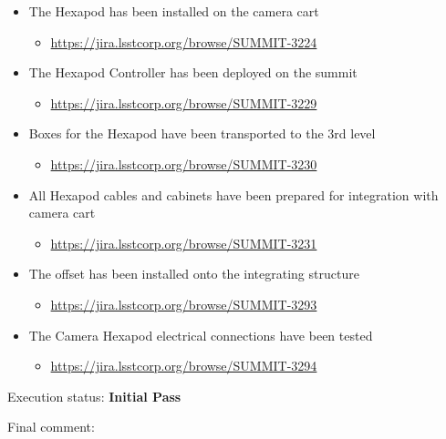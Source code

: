 \documentclass[SE,lsstdraft,STR,toc]{lsstdoc}
\providecommand{\tightlist}{
  \setlength{\itemsep}{0pt}\setlength{\parskip}{0pt}}
\begin{document}
\begin{itemize}
\tightlist
\item
  The Hexapod has been installed on the camera cart

  \begin{itemize}
  \tightlist
  \item
    \url{https://jira.lsstcorp.org/browse/SUMMIT-3224}
  \end{itemize}
\item
  The Hexapod Controller has been deployed on the summit

  \begin{itemize}
  \tightlist
  \item
    \url{https://jira.lsstcorp.org/browse/SUMMIT-3229}
  \end{itemize}
\item
  Boxes for the Hexapod have been transported to the 3rd level

  \begin{itemize}
  \tightlist
  \item
    \url{https://jira.lsstcorp.org/browse/SUMMIT-3230}
  \end{itemize}
\item
  All Hexapod cables and cabinets have been prepared for integration
  with camera cart

  \begin{itemize}
  \tightlist
  \item
    \url{https://jira.lsstcorp.org/browse/SUMMIT-3231}
  \end{itemize}
\item
  The offset has been installed onto the integrating structure

  \begin{itemize}
  \tightlist
  \item
    \url{https://jira.lsstcorp.org/browse/SUMMIT-3293}
  \end{itemize}
\item
  The Camera Hexapod electrical connections have been tested

  \begin{itemize}
  \tightlist
  \item
    \url{https://jira.lsstcorp.org/browse/SUMMIT-3294}
  \end{itemize}
\end{itemize}


Execution status: {\bf Initial Pass }

Final comment:\\
\end{document}

